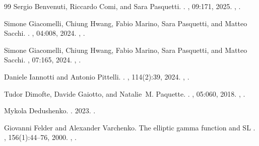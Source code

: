 \documentclass[11pt,a4paper]{article}
\makeatletter
\numberwithin{equation}{section}
\theoremstyle{plain}
\theoremstyle{definition}
\theoremstyle{remark}
\newcounter{mathrecordid}
\newcommand{\mathboxbegin}[1]{%
  \stepcounter{mathrecordid}%
  \immediate\write\mathrecords{\themathrecordid,#1}%
  \special{pdf:bann << /Type /Annot /Subtype /Link /Border [0 0 0]
    /MathBoxID \themathrecordid /F 2
    /A << /S /URI /URI (urn:mathbox:\themathrecordid) >> >>}}
\newcommand{\mathboxinlineplain}[1]{$#1$}
\newcommand{\mathboxinline}[1]{%
  $\mathboxbegin{inline}%
  \special{pdf:literal direct /MathBoxBegin\themathrecordid\space MP}%
  #1\special{pdf:literal direct /MathBoxEnd\themathrecordid\space MP}%
  \special{pdf:eann}$}
\newcommand{\recordmath}{%
  \ifmeasuring@\expandafter\mathboxinlineplain
  \else\expandafter\mathboxinline\fi}
\makeatother
\begin{document}
\begin{thebibliography}{99}
Sergio Benvenuti, Riccardo Comi, and Sara Pasquetti.
.
, 09:171, 2025.
\newblock \href {https://arxiv.org/abs/2410.19049} {},
  \href {https://doi.org/10.1007/JHEP09(2025)171}
  {}.

Simone Giacomelli, Chiung Hwang, Fabio Marino, Sara Pasquetti, and Matteo
  Sacchi.
.
, 04:008, 2024.
\newblock \href {https://arxiv.org/abs/2309.05326} {},
  \href {https://doi.org/10.1007/JHEP04(2024)008}
  {}.

Simone Giacomelli, Chiung Hwang, Fabio Marino, Sara Pasquetti, and Matteo
  Sacchi.
, 07:165, 2024.
\newblock \href {https://arxiv.org/abs/2401.14456} {},
  \href {https://doi.org/10.1007/JHEP07(2024)165}
  {}.

Daniele Iannotti and Antonio Pittelli.
.
, 114(2):39, 2024.
\newblock \href {https://arxiv.org/abs/2307.11634} {},
  \href {https://doi.org/10.1007/s11005-024-01788-x}
  {}.

Tudor Dimofte, Davide Gaiotto, and Natalie~M. Paquette.
.
, 05:060, 2018.
\newblock \href {https://arxiv.org/abs/1712.07654} {},
  \href {https://doi.org/10.1007/JHEP05(2018)060}
  {}.

Mykola Dedushenko.
.
 2023.
\newblock \href {https://arxiv.org/abs/2312.17747} {}.

Giovanni Felder and Alexander Varchenko.
\newblock The elliptic gamma function and {SL}\recordmath{(3,\mathbb z)\ltimes \mathbb
  z^3}.
, 156(1):44--76, 2000.
\newblock \href {https://arxiv.org/abs/math/9907061}
  {}, \href {https://doi.org/10.1006/aima.2000.1942}
  {}.


\end{thebibliography}
\end{document}
